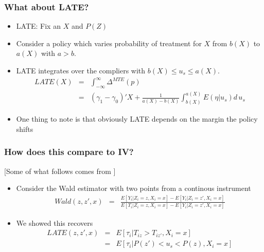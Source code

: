 \begin{frame}
\footnotesize
\frametitle{What about LATE?}
\begin{itemize}
  \item LATE: Fix an $X$ and $P(Z)$
  \item Consider a policy which varies probability of treatment for $X$ from $b(X)$ to $a(X)$ with $a > b$. 
  \item LATE integrates over the compliers with $b(X) \le u_s \le a(X)$.
\begin{eqnarray*}
LATE(X) &=& \int_{-\infty}^{\infty} \Delta^{MTE}(p) \\
        &=&  (\gamma_1 - \gamma_0)'X + \frac{1}{a(X)-b(X)} \int_{b(X)}^{a(X)} E(\eta | u_s) d\, u_s
\end{eqnarray*}

  \item One thing to note is that obviously LATE depends on the margin the policy shifts 

\end{itemize}
\end{frame}

\begin{frame}
  \footnotesize
  \frametitle{How does this compare to IV?}
  [Some of what follows comes from \citet{cornelissen2016late}]

  \begin{itemize}
    \item Consider the Wald estimator with two points from a continous instrument
  \begin{eqnarray*}
    Wald(z,z',x) &=& \frac{E[Y_i|Z_i = z,X_i=x] - E[Y_i|Z_i = z',X_i=x]}{E[T_i|Z_i = z,X_i=x]-E[Y_i|Z_i = z',X_i=x]}
  \end{eqnarray*}
    \item We showed this recovers   
    \begin{eqnarray*}
      LATE(z,z',x) &=& E[\tau_i | T_{iz} > T_{iz'},X_i=x] \\
                    &=& E[\tau_i | P(z') < u_s < P(z) ,X_i=x]
    \end{eqnarray*}
  \end{itemize}
\end{frame}

